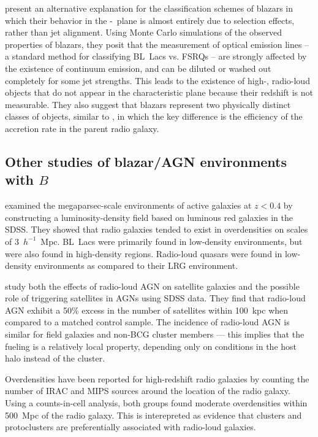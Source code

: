 \documentclass{emulateapj}
\begin{document}
\citet{gio12} present an alternative explanation for the classification schemes of blazars in which their behavior in the \nupeak-\lpeak~plane is almost entirely due to selection effects, rather than jet alignment. Using Monte Carlo simulations of the observed properties of blazars, they posit that the measurement of optical emission lines -- a standard method for classifying BL~Lacs vs. FSRQs -- are strongly affected by the existence of continuum emission, and can be diluted or washed out completely for some jet strengths. This leads to the existence of high-\nupeak, radio-loud objects that do not appear in the characteristic plane because their redshift is not measurable. They also suggest that blazars represent two physically distinct classes of objects, similar to \citet{mey11}, in which the key difference is the efficiency of the accretion rate in the parent radio galaxy. 

\subsection{Other studies of blazar/AGN environments with $B$}

\citet{lie11} examined the megaparsec-scale environments of active galaxies at $z<0.4$ by constructing a luminosity-density field based on luminous red galaxies in the SDSS. They showed that radio galaxies tended to exist in overdensities on scales of 3~$h^{-1}$~Mpc. BL~Lacs were primarily found in low-density environments, but were also found in high-density regions. Radio-loud quasars were found in low-density environments as compared to their LRG environment. 

\citet{pac14} study both the effects of radio-loud AGN on satellite galaxies and the possible role of triggering satellites in AGNs using SDSS data. They find that radio-loud AGN exhibit a 50\% excess in the number of satellites within 100~kpc when compared to a matched control sample. The incidence of radio-loud AGN is similar for field galaxies and non-BCG cluster members --- this implies that the fueling is a relatively local property, depending only on conditions in the host halo instead of the cluster. 

Overdensities have been reported for high-redshift radio galaxies by counting the number of IRAC \citep{gal12} and MIPS \citep{may12} sources around the location of the radio galaxy. Using a counts-in-cell analysis, both groups found moderate overdensities within 500~Mpc of the radio galaxy. This is interepreted as evidence that clusters and protoclusters are preferentially associated with radio-loud galaxies. 
\end{document}
